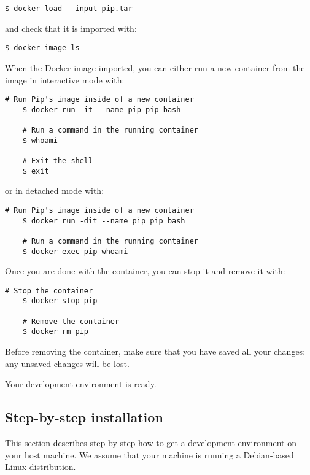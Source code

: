 \documentclass[10pt,a4paper,titlepage]{refart}
\begin{document}
\begin{lstlisting}[style=BashStyle]
$ docker load --input pip.tar
\end{lstlisting}

and check that it is imported with:

\begin{lstlisting}[style=BashStyle]
$ docker image ls
\end{lstlisting}

When the Docker image imported, you can either run a new container from the
image in interactive mode with:

\begin{lstlisting}[style=BashStyle]
    # Run Pip's image inside of a new container
    $ docker run -it --name pip pip bash

    # Run a command in the running container
    $ whoami

    # Exit the shell
    $ exit
\end{lstlisting}

or in detached mode with:

\begin{lstlisting}[style=BashStyle]
    # Run Pip's image inside of a new container
    $ docker run -dit --name pip pip bash

    # Run a command in the running container
    $ docker exec pip whoami
\end{lstlisting}

Once you are done with the container, you can stop it and remove it with:

\begin{lstlisting}[style=BashStyle]
    # Stop the container
    $ docker stop pip

    # Remove the container
    $ docker rm pip
\end{lstlisting}

Before removing the container, make sure that you have saved all your changes:
any unsaved changes will be lost.

Your development environment is ready.

\subsection{Step-by-step installation}

This section describes step-by-step how to get a development environment on your
host machine. We assume that your machine is running a Debian-based Linux
distribution.
\end{document}
